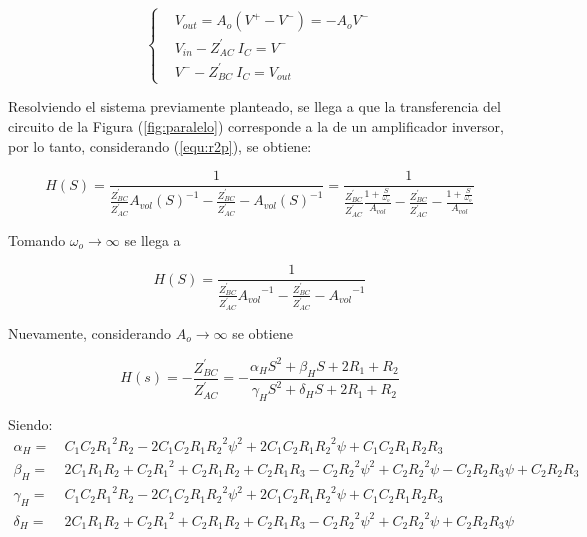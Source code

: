 \documentclass[a4paper]{article}
\begin{document}
\begin{equation*}
\left\{
\begin{aligned}
		& V_{out} = A_o \left( V^+ - V^- \right) =  -A_o V^- \\
		& V_{in} - Z_{AC}^{'} \ I_{C} = V^- \\
		& V^- - Z_{BC}^{'} \ I_{C} = V_{out}
\end{aligned}
\right.
\end{equation*}

Resolviendo el sistema previamente planteado, se llega a que la transferencia del circuito de la Figura (\ref{fig:paralelo}) corresponde a la de un amplificador inversor, por lo tanto, considerando (\ref{equ:r2p}), se obtiene:

\begin{equation*}
	H(S) = \frac{1}{\frac{Z_{BC}^{'}}{Z_{AC}^{'}} {A_{vol}\left(S\right)}^{-1} - \frac{Z_{BC}^{'}}{Z_{AC}^{'}} - {A_{vol}\left(S\right)}^{-1}} = \frac{1}{\frac{Z_{BC}^{'}}{Z_{AC}^{'}} \frac{1 + \frac{S}{\omega_o}}{A_{vol}} - \frac{Z_{BC}^{'}}{Z_{AC}^{'}} - \frac{1 + \frac{S}{\omega_o}}{A_{vol}}}
	\label{equ:hsavolw}
\end{equation*}

Tomando $\omega_o \rightarrow \infty$ se llega a

\begin{equation*}
	H(S) = \frac{1}{\frac{Z_{BC}^{'}}{Z_{AC}^{'}} {A_{vol}}^{-1} - \frac{Z_{BC}^{'}}{Z_{AC}^{'}} - {A_{vol}}^{-1}}
	\label{equ:hsavol}
\end{equation*}

Nuevamente, considerando $A_o \rightarrow \infty$ se obtiene

\begin{equation}
	H(s) = -\frac{Z_{BC}^{'}}{Z_{AC}^{'}} = - \frac{\alpha_H S^{2} + \beta_H S + 2 R_{1} + R_{2}}
	{\gamma_H S^{2} + \delta_H S + 2 R_{1} + R_{2}}
	\label{equ:hs}
\end{equation}

Siendo: 
\begin{equation}
\begin{split}
	\alpha_H =\ & C_{1} C_{2} {R_{1}}^{2} R_{2} - 2 C_{1} C_{2} R_{1} {R_{2}}^{2} \psi^{2} + 2 C_{1} C_{2} R_{1} {R_{2}}^{2} \psi + C_{1} C_{2} R_{1} R_{2} R_{3}\\
	\beta_H =\ & 2 C_{1} R_{1} R_{2} + C_{2} {R_{1}}^{2} + C_{2} R_{1} R_{2} + C_{2} R_{1} R_{3} - C_{2} {R_{2}}^{2} \psi^{2} + C_{2} {R_{2}}^{2} \psi - C_{2} R_{2} R_{3} \psi + C_{2} R_{2} R_{3}\\
	\gamma_H =\ & C_{1} C_{2} {R_{1}}^{2} R_{2} - 2 C_{1} C_{2} R_{1} {R_{2}}^{2} \psi^{2} + 2 C_{1} C_{2} R_{1} {R_{2}}^{2} \psi + C_{1} C_{2} R_{1} R_{2} R_{3}\\
	\delta_H =\ & 2 C_{1} R_{1} R_{2} + C_{2} {R_{1}}^{2} + C_{2} R_{1} R_{2} + C_{2} R_{1} R_{3} - C_{2} {R_{2}}^{2} \psi^{2} + C_{2} {R_{2}}^{2} \psi + C_{2} R_{2} R_{3} \psi
\end{split}
\label{equ:general}
\end{equation}
\end{document}
